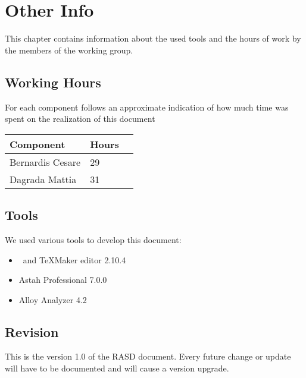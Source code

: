 \section{Other Info}
	This chapter contains information about the used tools and the hours of
	work by the members of the working group.
	\subsection{Working Hours}
	For each component follows an approximate indication of how much time was
	spent on the realization of this document
	\begin{center}
		\begin{tabular}{ | l | l | p{5cm} |}
			\hline
			Component & Hours 					\\ \hline
			Bernardis Cesare & 29 				\\ \hline
			Dagrada Mattia & 31  				\\ \hline
		\end{tabular}
	\end{center}
	\subsection{Tools}
	We used various tools to develop this document:
	\begin{itemize}
		\item \LaTeXe \, and TeXMaker editor 2.10.4
		\item Astah Professional 7.0.0
		\item Alloy Analyzer 4.2
	\end{itemize}
	\subsection{Revision}
	This is the version 1.0 of the RASD document. Every future change or
	update will have to be documented and will cause a version upgrade.